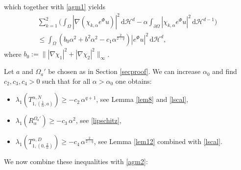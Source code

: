 \documentclass[11pt,oneside,reqno,a4paper]{amsart}
\newcommand{\dd}{\mathrm{d}}
\renewcommand{\H}{\mathcal{H}}
\theoremstyle{definition}
\begin{document}
which together with \eqref{agm1} yields
\begin{multline}
	\label{agm2}
\sum_{k=1}^2\Big(\int_{\Omega}|\nabla(\chi_{k,\alpha}e^{\Phi}u)|^2\, \dd \H^d
-\alpha\int_{\partial\Omega}|\chi_{k,\alpha}e^{\Phi}u|^2\, \dd \H^{d-1}\Big)\\
\le \int_{\Omega}(b_0\alpha^2+b^2\alpha^2-c_1\alpha^{\frac{2}{2-q}})|e^{\Phi}u|^2\, \dd \H^d,
\end{multline}
where $b_0:=\big\||\nabla\chi_1|^2+|\nabla\chi_2|^2\big\|_\infty$.


Let $a$ and $\Omega_a'$ be chosen as in Section \ref{secproof}. We can increase $\alpha_0$ and find $c_2,c_3,c_4>0$ such that for all $\alpha>\alpha_0$ one obtains:
\begin{itemize}
\item $\lambda_1(T_{1,(\frac{1}{\alpha},a)}^{\alpha,N})\ge -c_2\,\alpha^{q+1}$, see Lemma \ref{lem8} and \eqref{lscal},
\item $\lambda_1(R^{\Omega_a'}_\alpha)\ge -c_3\,\alpha^2$, see \eqref{lipschitz},
\item $\lambda_1(T_{1,(0,\frac{2}{\alpha})}^{\alpha,D})\ge -c_4\,\alpha^{\frac{2}{2-q}}$, see Lemma \ref{lem12} combined with \eqref{lscal}.
\end{itemize}
We now combine these inequalities with \eqref{agm2}:
\end{document}
